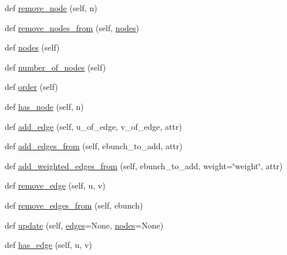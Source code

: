 \begin{DoxyCompactItemize}
def \hyperlink{classnetworkx_1_1classes_1_1graph_1_1Graph_aaba6b46ffe400f0a1ffa9af875170b2b}{remove\+\_\+node} (self, n)
\item 
def \hyperlink{classnetworkx_1_1classes_1_1graph_1_1Graph_a3259883c1fdd7a28c224af3cee9f27c6}{remove\+\_\+nodes\+\_\+from} (self, \hyperlink{classnetworkx_1_1classes_1_1graph_1_1Graph_ab5b03b460e5b1f2a06feaddcfb4fda3a}{nodes})
\item 
def \hyperlink{classnetworkx_1_1classes_1_1graph_1_1Graph_ab5b03b460e5b1f2a06feaddcfb4fda3a}{nodes} (self)
\item 
def \hyperlink{classnetworkx_1_1classes_1_1graph_1_1Graph_ad5cb93d5f9aea0bbe23ca50ac0b3c1f9}{number\+\_\+of\+\_\+nodes} (self)
\item 
def \hyperlink{classnetworkx_1_1classes_1_1graph_1_1Graph_abe8aa36ed63c7eaf7f8db16d760cc834}{order} (self)
\item 
def \hyperlink{classnetworkx_1_1classes_1_1graph_1_1Graph_af67788bc665a6418d802bef946d889a4}{has\+\_\+node} (self, n)
\item 
def \hyperlink{classnetworkx_1_1classes_1_1graph_1_1Graph_a2e456eed10460a4d9c1c32347d32e46d}{add\+\_\+edge} (self, u\+\_\+of\+\_\+edge, v\+\_\+of\+\_\+edge, attr)
\item 
def \hyperlink{classnetworkx_1_1classes_1_1graph_1_1Graph_a17001a607a31ab1b22a11befb92e0dde}{add\+\_\+edges\+\_\+from} (self, ebunch\+\_\+to\+\_\+add, attr)
\item 
def \hyperlink{classnetworkx_1_1classes_1_1graph_1_1Graph_abd79a871a021330ff7f1e47e408fa617}{add\+\_\+weighted\+\_\+edges\+\_\+from} (self, ebunch\+\_\+to\+\_\+add, weight=\char`\"{}weight\char`\"{}, attr)
\item 
def \hyperlink{classnetworkx_1_1classes_1_1graph_1_1Graph_a59b6121505c67e1e3b75b490eb93ede2}{remove\+\_\+edge} (self, u, v)
\item 
def \hyperlink{classnetworkx_1_1classes_1_1graph_1_1Graph_a0b13e6305a4d214a3c9d40c8e8253fdb}{remove\+\_\+edges\+\_\+from} (self, ebunch)
\item 
def \hyperlink{classnetworkx_1_1classes_1_1graph_1_1Graph_aaf72409cb7b39876c619d8142966e599}{update} (self, \hyperlink{classnetworkx_1_1classes_1_1graph_1_1Graph_a82640e2156b34c7c6c64c9bcb0295521}{edges}=None, \hyperlink{classnetworkx_1_1classes_1_1graph_1_1Graph_ab5b03b460e5b1f2a06feaddcfb4fda3a}{nodes}=None)
\item 
def \hyperlink{classnetworkx_1_1classes_1_1graph_1_1Graph_a125d2a5df7ca7e64b5c71971d69a5dea}{has\+\_\+edge} (self, u, v)
\item 

\end{DoxyCompactItemize}
